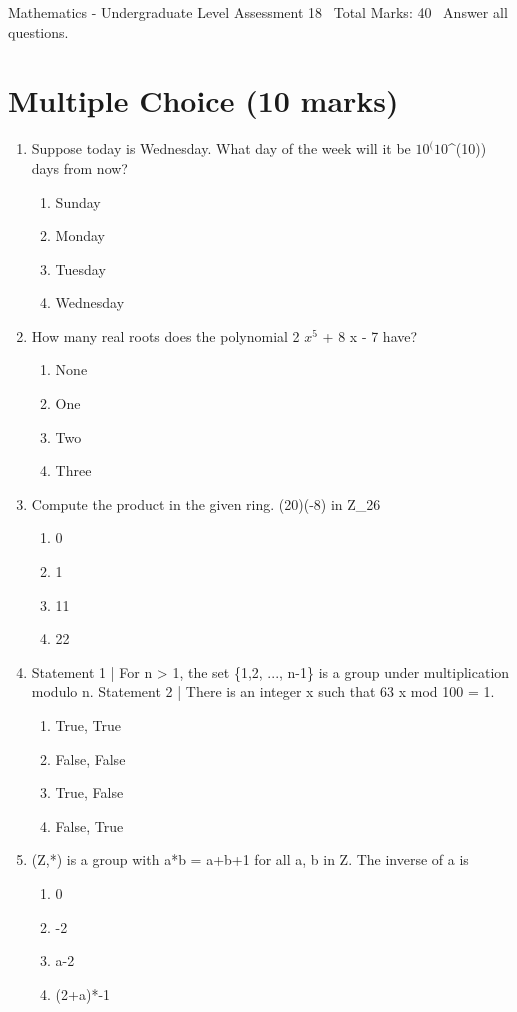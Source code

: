 \documentclass[12pt]{article}
\begin{document}
\begin{center}
Mathematics - Undergraduate Level Assessment 18 \
Total Marks: 40 \
Answer all questions.
\end{center}

\section*{Multiple Choice (10 marks)}
\begin{enumerate}[label=\arabic*.]
\item Suppose today is Wednesday. What day of the week will it be $10^(10$^(10)) days from now?
\begin{enumerate}[label=(\alph*)]
    \item Sunday
    \item Monday
    \item Tuesday
    \item Wednesday
\end{enumerate}
\item How many real roots does the polynomial 2 $x^5$ + 8 x - 7 have?
\begin{enumerate}[label=(\alph*)]
    \item None
    \item One
    \item Two
    \item Three
\end{enumerate}
\item Compute the product in the given ring. (20)(-8) in Z\_26
\begin{enumerate}[label=(\alph*)]
    \item 0
    \item 1
    \item 11
    \item 22
\end{enumerate}
\item Statement 1 | For n \textgreater{} 1, the set \{1,2, ..., n-1\} is a group under multiplication modulo n. Statement 2 | There is an integer x such that 63 x mod 100 = 1.
\begin{enumerate}[label=(\alph*)]
    \item True, True
    \item False, False
    \item True, False
    \item False, True
\end{enumerate}
\item (Z,*) is a group with a*b = a+b+1 for all a, b in Z. The inverse of a is
\begin{enumerate}[label=(\alph*)]
    \item 0
    \item -2
    \item a-2
    \item (2+a)*-1
\end{enumerate}
\end{enumerate}
\end{document}
